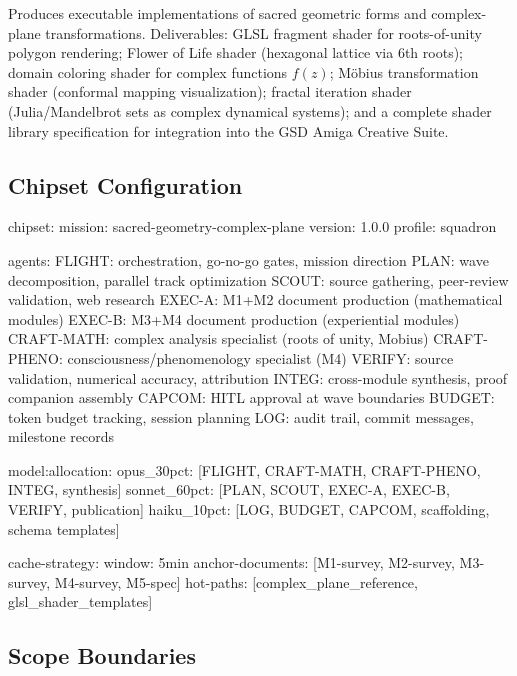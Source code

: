 \documentclass[11pt,letterpaper]{article}
\begin{document}
Produces executable implementations of sacred geometric forms and complex-plane transformations. Deliverables: GLSL fragment shader for roots-of-unity polygon rendering; Flower of Life shader (hexagonal lattice via 6th roots); domain coloring shader for complex functions $f(z)$; M\"{o}bius transformation shader (conformal mapping visualization); fractal iteration shader (Julia/Mandelbrot sets as complex dynamical systems); and a complete shader library specification for integration into the GSD Amiga Creative Suite.

\subsection{Chipset Configuration}

\begin{asciibox}
chipset:
  mission: sacred-geometry-complex-plane
  version: 1.0.0
  profile: squadron

  agents:
    FLIGHT:     orchestration, go-no-go gates, mission direction
    PLAN:       wave decomposition, parallel track optimization
    SCOUT:      source gathering, peer-review validation, web research
    EXEC-A:     M1+M2 document production (mathematical modules)
    EXEC-B:     M3+M4 document production (experiential modules)
    CRAFT-MATH: complex analysis specialist (roots of unity, Mobius)
    CRAFT-PHENO: consciousness/phenomenology specialist (M4)
    VERIFY:     source validation, numerical accuracy, attribution
    INTEG:      cross-module synthesis, proof companion assembly
    CAPCOM:     HITL approval at wave boundaries
    BUDGET:     token budget tracking, session planning
    LOG:        audit trail, commit messages, milestone records

  model:allocation:
    opus\_30pct:   [FLIGHT, CRAFT-MATH, CRAFT-PHENO, INTEG, synthesis]
    sonnet\_60pct: [PLAN, SCOUT, EXEC-A, EXEC-B, VERIFY, publication]
    haiku\_10pct:  [LOG, BUDGET, CAPCOM, scaffolding, schema templates]

  cache-strategy:
    window: 5min
    anchor-documents: [M1-survey, M2-survey, M3-survey, M4-survey, M5-spec]
    hot-paths: [complex\_plane\_reference, glsl\_shader\_templates]
\end{asciibox}

\subsection{Scope Boundaries}
\end{document}
